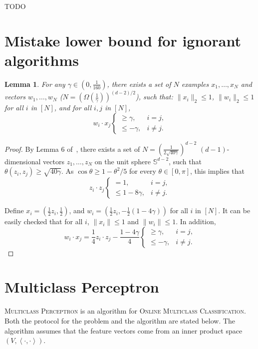 \documentclass[12pt]{article}
\newtheorem{lemma}[definition]{Lemma}
\newcommand{\ip}[2]{\left\langle #1, #2 \right\rangle} %
\begin{document}
TODO

\section{Mistake lower bound for ignorant algorithms}

\begin{lemma}
For any $\gamma \in (0,\frac 1 {160})$,
there exists a set of $N$ examples $x_1, \ldots, x_N$ and vectors $w_1, \ldots, w_N$ ($N = (\Omega(\frac{1}{\gamma}))^{(d-2)/2}$), such that:
$\| x_i \|_2 \leq 1$, $\| w_i \|_2 \leq 1$ for all $i$ in $[N]$, and for all $i, j$ in $[N]$,
\[ w_i \cdot x_j \begin{cases} \geq \gamma ,& i = j, \\ \leq -\gamma ,& i \neq j. \end{cases} \]
\label{lem:embed_d_gamma}
\end{lemma}
\begin{proof}
By Lemma 6 of~\cite{Long1995}, there exists a set of $N = (\frac{1}{2\sqrt{40\gamma}})^{d-2}$ $(d-1)$-dimensional vectors $z_1, \ldots, z_N$ on the unit sphere $\mathbb{S}^{d-2}$, such that
$\theta(z_i, z_j) \geq \sqrt{40 \gamma}$. As $\cos\theta \geq 1-\theta^2/5$ for every $\theta \in [0,\pi]$,
this implies that
\[ z_i \cdot z_j \begin{cases} = 1 ,& i = j, \\ \leq 1- 8\gamma ,& i \neq j. \end{cases} \]

Define $x_i = (\frac12 z_i, \frac12)$, and $w_i = (\frac 12 z_i, -\frac 12(1-4\gamma))$ for all $i$ in $[N]$. It can be easily checked that for all $i$, $\|x_i\| \leq 1$ and $\|w_i\| \leq 1$. In addition,
\[ w_i \cdot x_j = \frac 1 4 z_i \cdot z_j - \frac {1-4\gamma} 4 \begin{cases} \geq \gamma ,& i = j, \\ \leq -\gamma ,& i \neq j. \end{cases}\]
\end{proof}




\appendix

\section{Multiclass Perceptron}
\label{section:multiclass-perceptron-proofs}

\textsc{Multiclass Perceptron} is an algorithm for \textsc{Online Multiclass
Classification}. Both the protocol for the problem and the algorithm are stated
below. The algorithm assumes that the feature vectors come from an inner product
space $(V, \ip{\cdot}{\cdot})$.
\end{document}
